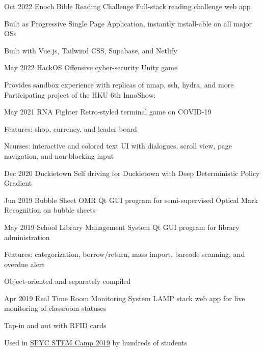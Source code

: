 \projectEntry
{Oct 2022}
{Enoch Bible Reading Challenge}
{Full-stack reading challenge web app}
{
\begin{descitemize}
	\item Built as Progressive Single Page Application, instantly install-able on all major OSs
    \item Built with Vue.js, Tailwind CSS, Supabase, and Netlify
\end{descitemize}
}

\hypertarget{HackOS}{
\projectEntry
{May 2022}
{HackOS}
{Offensive cyber-security Unity game}
{
\begin{descitemize}
    \item Provides sandbox experience with replicas of nmap, ssh, hydra, and more
    \specialitem Participating project of the HKU 6th InnoShow:
\end{descitemize}
}
}

\projectEntry
{May 2021}
{RNA Fighter}
{Retro-styled terminal game on COVID-19}
{
\begin{descitemize}
	\item Features: shop, currency, and leader-board
	\item Ncurses: interactive and colored text UI with dialogues, scroll view, page navigation, and non-blocking input
\end{descitemize}
}

\projectEntry
{Dec 2020}
{Duckietown}
{Self driving for Duckietown with Deep Deterministic Policy Gradient}
{}

\projectEntry
{Jun 2019}
{Bubble Sheet OMR}
{Qt GUI program for semi-supervised Optical Mark Recognition on bubble sheets}
{}

\projectEntry
{May 2019}
{School Library Management System}
{Qt GUI program for library administration}
{
\begin{descitemize}
    \item Features: categorization, borrow/return, mass import, barcode scanning, and overdue alert
    \item Object-oriented and separately compiled
\end{descitemize}
}

\hypertarget{RTRMS}{
\projectEntry
{Apr 2019}
{Real Time Room Monitoring System}
{LAMP stack web app for live monitoring of classroom statuses}
{
\begin{descitemize}
    \item Tap-in and out with RFID cards
    \item Used in \hyperlink{STEM_Camp_2019}{SPYC STEM Camp 2019} by hundreds of students
\end{descitemize}
}
}

